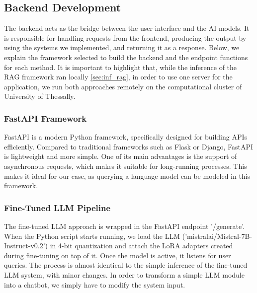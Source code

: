 \subsection{Backend Development}
\label{sec:backend_development}

The backend acts as the bridge between the user interface and the AI models. It is responsible for handling requests from the frontend, producing the output by using the systems we implemented, and returning it as a response. Below, we explain the framework selected to build the backend and the endpoint functions for each method. It is important to highlight that, while the inference of the RAG framework ran locally \ref{sec:inf_rag}, in order to use one server for the application, we run both approaches remotely on the computational cluster of University of Thessally.


\subsubsection{FastAPI Framework}

FastAPI is a modern Python framework, specifically designed for building APIs efficiently. Compared to traditional frameworks such as Flask or Django, FastAPI is lightweight and more simple. One of its main advantages is the support of asynchronous requests, which makes it suitable for long-running processes. This makes it ideal for our case, as querying a language model can be modeled in this framework.



\subsubsection{Fine-Tuned LLM Pipeline}
\label{sec:backend_ft}

The fine-tuned LLM approach is wrapped in the FastAPI endpoint '/generate'. When the Python script starts running, we load the LLM ('mistralai/Mistral-7B-Instruct-v0.2') in 4-bit quantization and attach the LoRA adapters created during fine-tuning on top of it. Once the model is active, it listens for user queries. The process is almost identical to the simple inference of the fine-tuned LLM system, with minor changes. In order to transform a simple LLM module into a chatbot, we simply have to modify the system input. 

